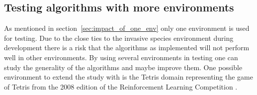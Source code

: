 \subsection{Testing algorithms with more environments}

As mentioned in section~\ref{sec:impact_of_one_env} only one environment is
used for testing. Due to the close ties to the invasive species environment
during development there is a risk that the algorithms as implemented will not
perform well in other environments. By using several environments in testing
one can study the generality of the algorithms and maybe improve them. One
possible environment to extend the study with is the Tetris domain representing
the game of Tetris from the 2008 edition of the Reinforcement Learning
Competition \parencite{whiteson2010reinforcement}.  
